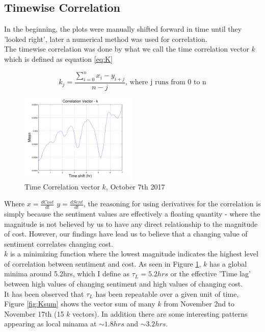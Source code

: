 \documentclass[12pt,journal,compsoc]{IEEEtran}
\begin{document}
\subsection{Timewise Correlation}
In the beginning, the plots were manually shifted forward in time until they 'looked right', later a numerical method was used
for correlation.\\

The timewise correlation was done by what we call the time correlation vector $k$ which is defined as equation \ref{eq:K}

\begin{equation}\label{eq:K}
k_j = \frac{\sum\limits_{i=0}^n x_i - y_{i+j}}{n-j} \textrm{, where j runs from 0 to n}
\end{equation}

\begin{figure}[h]
	\centering
	\includegraphics[width=0.5\textwidth]{../Datasets/Plots/Oct7_K}
	\caption{Time Correlation vector $k$, October 7th 2017}
	\label{fig:K}
\end{figure}

Where $x = \frac{dCost}{dt}$ $y = \frac{dSent}{dt}$, the reasoning for using derivatives for the correlation is simply because
the sentiment values are effectively a floating quantity - where the magnitude is not believed by us to have any direct 
relationship to the magnitude of cost. However, our findings have lead us to believe that a changing value of sentiment correlates
changing cost.\\

$k$ is a minimizing function where the lowest magnitude indicates the highest level of correlation between sentiment and cost.
As seen in Figure \ref{fig:K}, $k$ has a global minima around 5.2hrs, which I define as $\tau_L = 5.2hrs$ 
or the effective 'Time lag' between high values of changing sentiment and high values of changing cost.\\

It has been observed that $\tau_L$ has been repeatable over a given unit of time, Figure \ref{fig:Ksum} 
shows the vector sum of many $k$ from November 2nd to November 17th (15 $k$ vectors). In addition there are some interesting 
patterns appearing as local minama at $\sim1.8hrs$ and $\sim3.2hrs$.
\end{document}
